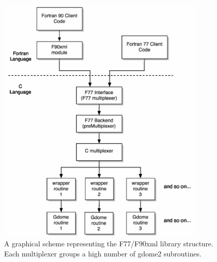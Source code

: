 \begin{center}
\begin{figure}[t]
\begin{center}
\includegraphics[width=100mm,keepaspectratio]{04_grid/images/f77xml-high-level-gimped.eps}
\end{center}
\caption{\footnotesize A graphical scheme representing the F77/F90xml
library structure. Each multiplexer groups a high number of gdome2
subroutines.}
\label{fig:f77xml-high-level}
\end{figure}
\end{center}
